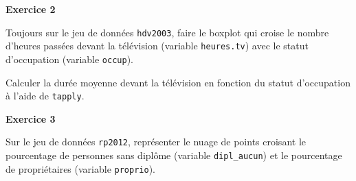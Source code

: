 \documentclass[12pt,]{book}
\newenvironment{Shaded}{\begin{snugshade}}{\end{snugshade}}
\newcommand{\DataTypeTok}[1]{\textcolor[rgb]{0.27,0.27,0.27}{#1}}
\newcommand{\KeywordTok}[1]{\textcolor[rgb]{0.27,0.27,0.27}{\textbf{#1}}}
\newcommand{\NormalTok}[1]{#1}
\newcommand{\OperatorTok}[1]{\textcolor[rgb]{0.43,0.43,0.43}{\textbf{#1}}}
\newcommand{\OtherTok}[1]{\textcolor[rgb]{0.37,0.37,0.37}{#1}}
\newcommand{\StringTok}[1]{\textcolor[rgb]{0.5,0.5,0.5}{#1}}
\begin{document}
\fi

\textbf{Exercice 2}

Toujours sur le jeu de données \texttt{hdv2003}, faire le boxplot qui croise le nombre d'heures passées devant la télévision (variable \texttt{heures.tv}) avec le statut d'occupation (variable \texttt{occup}).

Calculer la durée moyenne devant la télévision en fonction du statut d'occupation à l'aide de \texttt{tapply}.

\textbf{Exercice 3}

Sur le jeu de données \texttt{rp2012}, représenter le nuage de points croisant le pourcentage de personnes sans diplôme (variable \texttt{dipl\_aucun}) et le pourcentage de propriétaires (variable \texttt{proprio}).

\iffalse

\begin{solution}

\begin{Shaded}
\end{Shaded}

\end{solution}
\end{document}
